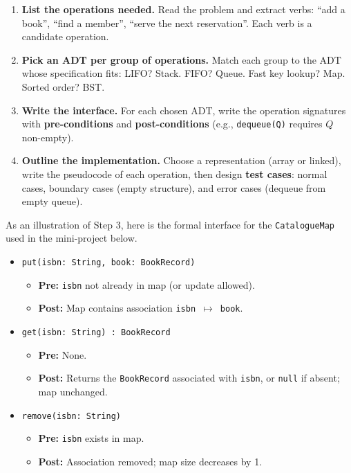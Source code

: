 \documentclass[11pt]{article}
\begin{document}
\begin{methode}
\begin{enumerate}
\item \textbf{List the operations needed.} Read the problem and extract verbs: ``add a book'', ``find a member'', ``serve the next reservation''. Each verb is a candidate operation.
\item \textbf{Pick an ADT per group of operations.} Match each group to the ADT whose specification fits: LIFO? Stack. FIFO? Queue. Fast key lookup? Map. Sorted order? BST.
\item \textbf{Write the interface.} For each chosen ADT, write the operation signatures with \textbf{pre-conditions} and \textbf{post-conditions} (e.g., \texttt{dequeue(Q)} requires $Q$ non-empty).
\item \textbf{Outline the implementation.} Choose a representation (array or linked), write the pseudocode of each operation, then design \textbf{test cases}: normal cases, boundary cases (empty structure), and error cases (dequeue from empty queue).
\end{enumerate}
\end{methode}

\begin{exemplebox}
As an illustration of Step 3, here is the formal interface for the \texttt{CatalogueMap} used in the mini-project below.

\begin{itemize}
\item \texttt{put(isbn: String, book: BookRecord)}
  \begin{itemize}
  \item \textbf{Pre:} \texttt{isbn} not already in map (or update allowed).
  \item \textbf{Post:} Map contains association \texttt{isbn $\mapsto$ book}.
  \end{itemize}
\item \texttt{get(isbn: String) : BookRecord}
  \begin{itemize}
  \item \textbf{Pre:} None.
  \item \textbf{Post:} Returns the \texttt{BookRecord} associated with \texttt{isbn}, or \texttt{null} if absent; map unchanged.
  \end{itemize}
\item \texttt{remove(isbn: String)}
  \begin{itemize}
  \item \textbf{Pre:} \texttt{isbn} exists in map.
  \item \textbf{Post:} Association removed; map size decreases by 1.
  \end{itemize}
\end{itemize}
\end{exemplebox}
\end{document}
